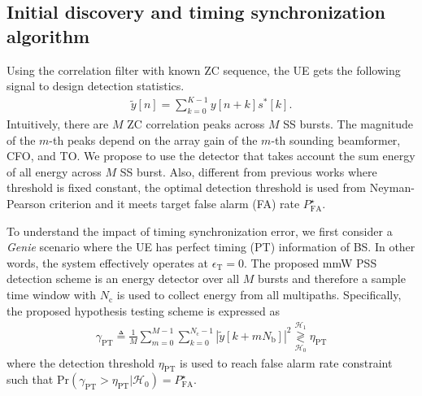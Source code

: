 \documentclass[journal]{IEEEtran}
\newcommand{\hermitian}[0]{\text{H}}
\newcommand{\CFO}[0]{\epsilon_{\text{F}}}
\newcommand{\STO}[0]{\epsilon_{\text{T}}}
\newcommand{\Nc}[0]{N_{\text{c}}}
\newcommand{\prob}[0]{\mathrm{Pr}}
\begin{document}
\subsection{Initial discovery and timing synchronization algorithm}
Using the correlation filter with known ZC sequence, the UE gets the following signal to design detection statistics.
\begin{align}
\tilde{y}[n] = \sum_{k=0}^{K-1}y[n+k]s^*[k].
\label{eq:ZC_correlation}
\end{align}
Intuitively, there are $M$ ZC correlation peaks across $M$ SS bursts. The magnitude of the $m$-th peaks depend on the array gain of the $m$-th sounding beamformer, CFO, and TO. We propose to use the detector that takes account the sum energy of all energy across $M$ SS burst. Also, different from previous works \cite{7161389,KTH_stoch_geo_IA_arxiv_1802,UTA_stocha_geo_IA_TCOM_18} where threshold is fixed constant, the optimal detection threshold is used from Neyman-Pearson criterion and it meets target false alarm (FA) rate $P^{\star}_{\text{FA}}$.

To understand the impact of timing synchronization error, we first consider a \textit{Genie} scenario where the UE has perfect timing (PT) information of BS. In other words, the system effectively operates at $\STO = 0$. The proposed mmW PSS detection scheme is an energy detector over all $M$ bursts and therefore a sample time window with $\Nc$ is used to collect energy from all multipaths. Specifically, the proposed hypothesis testing scheme is expressed as
\begin{align}
\gamma_{\text{PT}} \triangleq \frac{1}{M}\sum_{m=0}^{M-1}\sum_{k=0}^{\Nc-1}\left|\tilde{y}[k+mN_{\text{b}}]\right|^2 \underset{\mathcal{H}_0}{\overset{\mathcal{H}_1}{\gtrless}} \eta_{\text{PT}}
\label{eq:ED_wo_STO}
\end{align}
where the detection threshold $\eta_{\text{PT}}$ is used to reach false alarm rate constraint such that $\prob(\gamma_{\text{PT}} > \eta_{\text{PT}}|\mathcal{H}_0) = P^{\star}_{\text{FA}}$.
\end{document}
